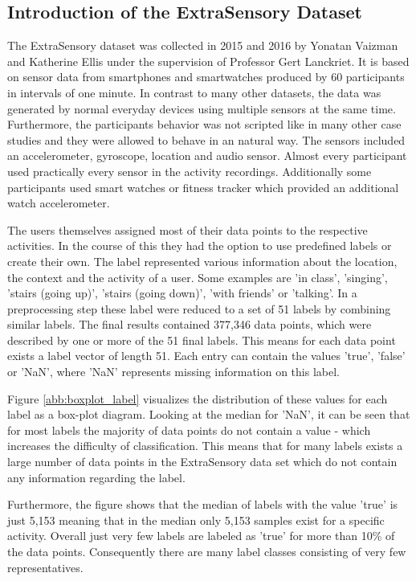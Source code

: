 \subsection{Introduction of the ExtraSensory Dataset}

The ExtraSensory dataset was collected in 2015 and 2016 by Yonatan Vaizman and Katherine Ellis under the supervision of Professor Gert Lanckriet. It is based on sensor data from smartphones and smartwatches produced by 60 participants in intervals of one minute. In contrast to many other datasets, the data was generated by normal everyday devices using multiple sensors at the same time. Furthermore, the participants behavior was not scripted like in many other case studies and they were allowed to behave in an natural way. The sensors included an accelerometer, gyroscope, location and audio sensor. Almost every participant used practically every sensor in the activity recordings. Additionally some participants used smart watches or fitness tracker which provided an additional watch accelerometer.

The users themselves assigned most of their data points to the respective activities. In the course of this they had the option to use predefined labels or create their own. The label represented various information about the location, the context and the activity of a user. Some examples are 'in class', 'singing', 'stairs (going up)', 'stairs (going down)', 'with friends' or 'talking'. In a preprocessing step these label were reduced to a set of 51 labels by combining similar labels.
The final results contained 377,346 data points, which were described by one or more of the 51 final labels. This means for each data point exists a label vector of length 51. Each entry can contain the values 'true', 'false' or 'NaN', where 'NaN' represents missing information on this label.

Figure \ref{abb:boxplot_label} visualizes the distribution of these values for each label as a box-plot diagram. Looking at the median for 'NaN', it can be seen that for most labels the majority of data points do not contain a value - which increases the difficulty of classification. This means that for many labels exists a large number of data points in the ExtraSensory data set which do not contain any information regarding the label.

Furthermore, the figure shows that the median of labels with the value 'true' is just 5,153 meaning that in the median only 5,153 samples exist for a specific activity. Overall just very few labels are labeled as 'true' for more than 10\% of the data points. Consequently there are many label classes consisting of very few representatives. 

